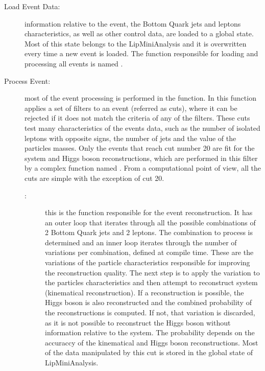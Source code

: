 \begin{description}
	\item[Load Event Data:] information relative to the event, the Bottom Quark jets and leptons characteristics, as well as other control data, are loaded to a global state. Most of this state belongs to the LipMiniAnalysis and it is overwritten every time a new event is loaded. The function responsible for loading and processing all events is named \ttLoop.
	\item[Process Event:] most of the event processing is performed in the \ttDoCuts function. In this function applies a set of filters to an event (referred as cuts), where it can be rejected if it does not match the criteria of any of the filters. These cuts test many characteristics of the events data, such as the number of isolated leptons with opposite signs, the number of jets and the value of the particles masses. Only the events that reach cut number 20 are fit for the \ttbar system and Higgs boson reconstructions, which are performed in this filter by a complex function named \ttDilepKinFit. From a computational point of view, all the cuts are simple with the exception of cut 20.
	\begin{description}
		\item[\ttDilepKinFit:] this is the function responsible for the event reconstruction. It has an outer loop that iterates through all the possible combinations of 2 Bottom Quark jets and 2 leptons. The combination to process is determined and an inner loop iterates through the number of variations per combination, defined at compile time. These are the variations of the particle characteristics responsible for improving the reconstruction quality. The next step is to apply the variation to the particles characteristics and then attempt to reconstruct \ttbar system (kinematical reconstruction). If a reconstruction is possible, the Higgs boson is also reconstructed and the combined probability of the reconstructions is computed. If not, that variation is discarded, as it is not possible to reconstruct the Higgs boson without information relative to the \ttbar system. The probability depends on the accuraccy of the kinematical and Higgs boson reconstructions. Most of the data manipulated by this cut is stored in the global state of LipMiniAnalysis.
	\end{description}
\end{description}

